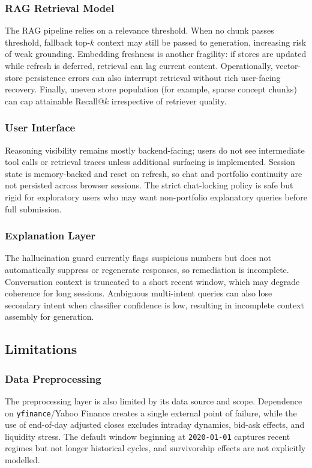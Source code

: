 \subsubsection{RAG Retrieval Model}
The RAG pipeline relies on a relevance threshold. When no chunk passes threshold, fallback top-\(k\) context may still be passed to generation, increasing risk of weak grounding. Embedding freshness is another fragility: if stores are updated while refresh is deferred, retrieval can lag current content. Operationally, vector-store persistence errors can also interrupt retrieval without rich user-facing recovery. Finally, uneven store population (for example, sparse concept chunks) can cap attainable Recall@\(k\) irrespective of retriever quality.

\subsubsection{User Interface}
Reasoning visibility remains mostly backend-facing; users do not see intermediate tool calls or retrieval traces unless additional surfacing is implemented. Session state is memory-backed and reset on refresh, so chat and portfolio continuity are not persisted across browser sessions. The strict chat-locking policy is safe but rigid for exploratory users who may want non-portfolio explanatory queries before full submission.

\subsubsection{Explanation Layer}
The hallucination guard currently flags suspicious numbers but does not automatically suppress or regenerate responses, so remediation is incomplete. Conversation context is truncated to a short recent window, which may degrade coherence for long sessions. Ambiguous multi-intent queries can also lose secondary intent when classifier confidence is low, resulting in incomplete context assembly for generation.



\subsection{Limitations}

\subsubsection{Data Preprocessing}
The preprocessing layer is also limited by its data source and scope. Dependence on \texttt{yfinance}/Yahoo Finance creates a single external point of failure, while the use of end-of-day adjusted closes excludes intraday dynamics, bid-ask effects, and liquidity stress. The default window beginning at \texttt{2020-01-01} captures recent regimes but not longer historical cycles, and survivorship effects are not explicitly modelled.

